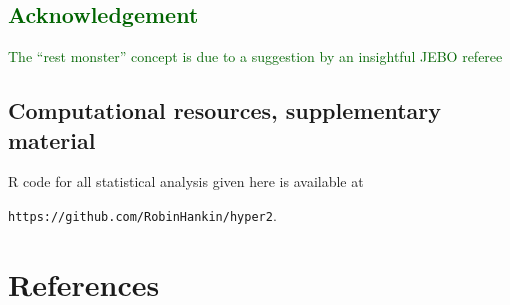 \documentclass[review]{elsarticle}
\begin{document}
\subsection*{\textcolor{DarkGreen}{Acknowledgement}}

\textcolor{DarkGreen}{The ``rest monster'' concept is due to a
  suggestion by an insightful JEBO referee}

\subsection*{Computational resources, supplementary material}

R code for all statistical analysis given here is available at

{\tt https://github.com/RobinHankin/hyper2}.

\section*{References}


\end{document}
